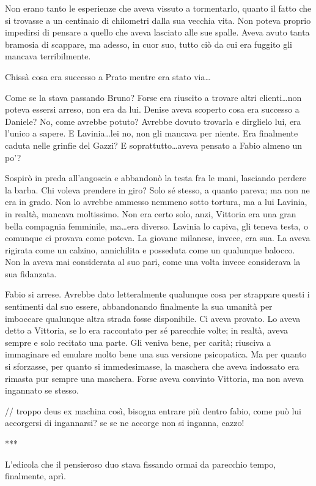 Non erano tanto le esperienze che aveva vissuto a tormentarlo, quanto il fatto che si trovasse a un centinaio di chilometri dalla sua vecchia vita. Non poteva proprio impedirsi di pensare a quello che aveva lasciato alle sue spalle. Aveva avuto tanta bramosia di scappare, ma adesso, in cuor suo, tutto ciò da cui era fuggito gli mancava terribilmente.

Chissà cosa era successo a Prato mentre era stato via\ldots

Come se la stava passando Bruno? Forse era riuscito a trovare altri clienti\ldots non poteva essersi arreso, non era da lui. Denise aveva scoperto cosa era successo a Daniele? No, come avrebbe potuto? Avrebbe dovuto trovarla e dirglielo lui, era l'unico a sapere. E Lavinia\ldots lei no, non gli mancava per niente. Era finalmente caduta nelle grinfie del Gazzi? E soprattutto\ldots aveva pensato a Fabio almeno un po'?

Sospirò in preda all'angoscia e abbandonò la testa fra le mani, lasciando perdere la barba. Chi voleva prendere in giro? Solo sé stesso, a quanto pareva; ma non ne era in grado. Non lo avrebbe ammesso nemmeno sotto tortura, ma a lui Lavinia, in realtà, mancava moltissimo. Non era certo solo, anzi, Vittoria era una gran bella compagnia femminile, ma\ldots era diverso. Lavinia lo capiva, gli teneva testa, o comunque ci provava come poteva. La giovane milanese, invece, era sua. La aveva rigirata come un calzino, annichilita e posseduta come un qualunque balocco. Non la aveva mai considerata al suo pari, come una volta invece considerava la sua fidanzata.

Fabio si arrese. Avrebbe dato letteralmente qualunque cosa per strappare questi i sentimenti dal suo essere, abbandonando finalmente la sua umanità per imboccare qualunque altra strada fosse disponibile. Ci aveva provato. Lo aveva detto a Vittoria, se lo era raccontato per sé parecchie volte; in realtà, aveva sempre e solo recitato una parte. Gli veniva bene, per carità; riusciva a immaginare ed emulare molto bene una sua versione psicopatica. Ma per quanto si sforzasse, per quanto si immedesimasse, la maschera che aveva indossato era rimasta pur sempre una maschera. Forse aveva convinto Vittoria, ma non aveva ingannato se stesso.

// troppo deus ex machina così, bisogna entrare più dentro fabio, come può lui accorgersi di ingannarsi? se se ne accorge non si inganna, cazzo!

***

L'edicola che il pensieroso duo stava fissando ormai da parecchio tempo, finalmente, aprì.

